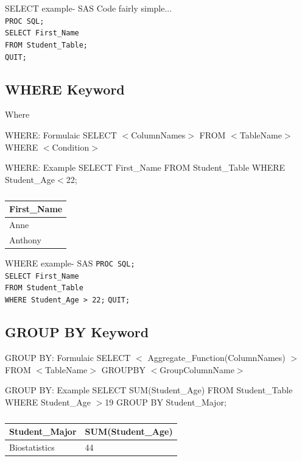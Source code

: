 \documentclass[handout]{beamer}
\begin{document}
	\begin{frame}{SELECT example- SAS}
		Code fairly simple... \\ \pause 
		\texttt{PROC SQL;} \\
		\texttt{SELECT First\_Name } \\
		\texttt{FROM Student\_Table;}\\
		\texttt{QUIT;}
	\end{frame}
	
	\subsection{WHERE Keyword}
	\begin{frame}{Where}
		\begin{block}{WHERE: Formulaic}
			SELECT $<$ColumnNames$>$ FROM $<$TableName$>$ 
			WHERE $<$Condition$>$
		\end{block}
		\begin{block}{WHERE: Example}
			SELECT First\_Name FROM Student\_Table 
			WHERE Student\_Age$<$22;
		\end{block}
	\begin{table}[H]
	\centering
	\caption*{}

	\begin{tabular}{|l|}
		\hline
		First\_Name  \\ \hline
		Anne  \\ \hline
		Anthony  \\    \hline
	\end{tabular}
	\end{table}		
	\end{frame}
	
	\begin{frame}{WHERE example- SAS}
		\texttt{PROC SQL;} \\
		\texttt{SELECT First\_Name } \\
		\texttt{FROM Student\_Table}\\
		\texttt{WHERE Student\_Age > 22;} 
		\texttt{QUIT;}
	\end{frame}
		\subsection{GROUP BY Keyword}
		\begin{frame}
		\begin{block}{GROUP BY: Formulaic}
			SELECT $<$ Aggregate\_Function(ColumnNames) $>$ FROM $<$TableName$>$ GROUPBY $<$GroupColumnName$>$
		\end{block}
		\begin{block}{GROUP BY: Example}
			SELECT SUM(Student\_Age) FROM Student\_Table WHERE Student\_Age $>$19 GROUP BY Student\_Major;
		\end{block}
		\begin{table}[H]
			\centering
			\caption*{}

			\begin{tabular}{|l|l|}
				\hline
				Student\_Major & SUM(Student\_Age)  \\ \hline
				Biostatistics  & 44 \\ \hline
			\end{tabular}
		\end{table}			
		\end{frame}
		
\end{document}
